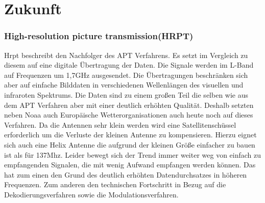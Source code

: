 
\part{Zukunft}
\section[]{High-resolution picture transmission(HRPT)}

Hrpt beschreibt den Nachfolger des APT Verfahrens. Es setzt im Vergleich zu diesem auf eine digitale Übertragung der Daten. Die Signale werden im L-Band auf Frequenzen um 1,7GHz ausgesendet. Die Übertragungen beschränken sich aber auf einfache Bilddaten in verschiedenen Wellenlängen des visuellen und infraroten Spektrums. Die Daten sind zu einem großen Teil die selben wie aus dem APT Verfahren aber mit einer deutlich erhöhten Qualität. Deshalb setzten neben Noaa auch Europäische Wetterorganisationen auch heute noch auf dieses Verfahren. Da die Antennen sehr klein werden wird eine Satellitenschüssel erforderlich um die Verluste der kleinen Antenne zu kompensieren. Hierzu eignet sich auch eine Helix Antenne die aufgrund der kleinen Größe einfacher zu bauen ist als für 137Mhz. Leider bewegt sich der Trend immer weiter weg von einfach zu empfangenden Signalen, die mit wenig Aufwand empfangen werden können. Das hat zum einen den Grund des deutlich erhöhten Datendurchsatzes in höheren Frequenzen. Zum anderen den technischen Fortschritt in Bezug auf die Dekodierungsverfahren sowie die Modulationsverfahren.  

